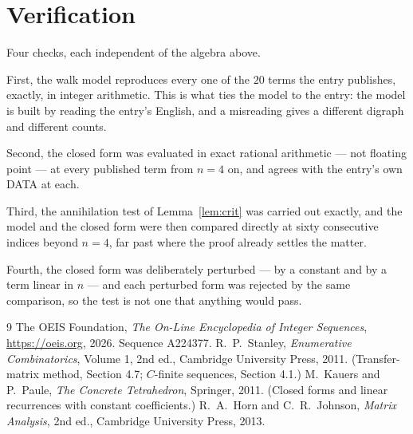 \documentclass[11pt,a4paper]{article}
\theoremstyle{plain}
\theoremstyle{definition}
\begin{document}
\section{Verification}

Four checks, each independent of the algebra above.

First, the walk model reproduces every one of the $20$ terms the entry publishes,
exactly, in integer arithmetic. This is what ties the model to the entry: the model is built
by reading the entry's English, and a misreading gives a different digraph and different
counts.

Second, the closed form was evaluated in exact rational arithmetic --- not floating point ---
at every published term from $n=4$ on, and agrees with the entry's own DATA at each.

Third, the annihilation test of Lemma~\ref{lem:crit} was carried out exactly, and the model
and the closed form were then compared directly at sixty consecutive indices beyond
$n=4$, far past where the proof already settles the matter.

Fourth, the closed form was deliberately perturbed --- by a constant and by a term linear in
$n$ --- and each perturbed form was rejected by the same comparison, so the test is not one
that anything would pass.

\begin{thebibliography}{9}
 The OEIS Foundation, \emph{The On-Line Encyclopedia of Integer
Sequences}, \url{https://oeis.org}, 2026. Sequence A224377.
 R.~P.~Stanley, \emph{Enumerative Combinatorics}, Volume 1, 2nd ed.,
Cambridge University Press, 2011. (Transfer-matrix method, Section 4.7; $C$-finite sequences,
Section 4.1.)
 M.~Kauers and P.~Paule, \emph{The Concrete Tetrahedron}, Springer, 2011.
(Closed forms and linear recurrences with constant coefficients.)
 R.~A.~Horn and C.~R.~Johnson, \emph{Matrix Analysis}, 2nd ed., Cambridge
University Press, 2013.
\end{thebibliography}
\end{document}
